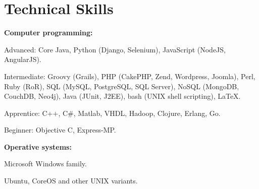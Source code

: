 


\section{Technical Skills}
%
% 
% 
\textbf{Computer programming:}

    \begin{innerlist}
\item Advanced: Core Java, Python (Django, Selenium), JavaScript
(NodeJS, AngularJS).
\item Intermediate: Groovy (Grails), PHP
(CakePHP, Zend, Wordpress, Joomla), Perl, Ruby (RoR), SQL (MySQL, PostgreSQL,
SQL Server), NoSQL (MongoDB, CouchDB, Neo4j), 
Java (JUnit, J2EE), bash (UNIX shell scripting), \LaTeX{}.
\item Apprentice: C$+$$+$, C\#, Matlab, VHDL, Hadoop, Clojure,
Erlang, Go.
\item Beginner: Objective C, Express-MP.
    \end{innerlist}

\halfblankline

\textbf{Operative systems:}
    \begin{innerlist}
\item Microsoft Windows family.
\item Ubuntu, CoreOS and other UNIX variants.
    \end{innerlist}

